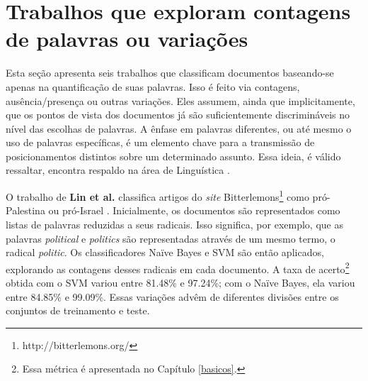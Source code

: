 

\section{Trabalhos que exploram contagens de palavras ou variações}
\label{contagem}

Esta seção apresenta seis trabalhos que classificam documentos baseando-se apenas na quantificação de suas palavras. Isso é feito via contagens, ausência/presença ou outras variações. Eles assumem, ainda que implicitamente, que os pontos de vista dos documentos já são suficientemente discrimináveis no nível das escolhas de palavras. A ênfase em palavras diferentes, ou até mesmo o uso de palavras específicas, é um elemento chave para a transmissão de posicionamentos distintos sobre um determinado assunto. Essa ideia, é válido ressaltar, encontra respaldo na área de Linguística \cite{teubert}. %

O trabalho de \textbf{Lin et al.} classifica artigos do \emph{site} Bitterlemons\footnote{http://bitterlemons.org/} como pró-Palestina ou pró-Israel \cite{lin-et-al2006}. Inicialmente, os documentos são representados como listas de palavras reduzidas a seus radicais. Isso significa, por exemplo, que as palavras \emph{political} e \emph{politics} são representadas através de um mesmo termo, o radical \emph{politic}. Os classificadores Naïve Bayes e SVM são então aplicados, explorando as contagens desses radicais em cada documento. A taxa de acerto\footnote{Essa métrica é apresentada no Capítulo \ref{basicos}.} obtida com o SVM variou entre 81.48\% e 97.24\%; com o Naïve Bayes, ela variou entre 84.85\% e 99.09\%. Essas variações advêm de diferentes divisões entre os conjuntos de treinamento e teste. 

